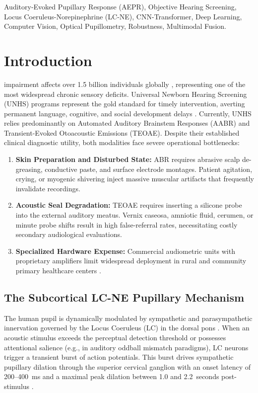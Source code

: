\documentclass[journal]{IEEEtran}
\begin{document}
\begin{IEEEkeywords}
Auditory-Evoked Pupillary Response (AEPR), Objective Hearing Screening, Locus Coeruleus-Norepinephrine (LC-NE), CNN-Transformer, Deep Learning, Computer Vision, Optical Pupillometry, Robustness, Multimodal Fusion.
\end{IEEEkeywords}

\section{Introduction}
 impairment affects over 1.5 billion individuals globally \cite{who2021world}, representing one of the most widespread chronic sensory deficits. Universal Newborn Hearing Screening (UNHS) programs represent the gold standard for timely intervention, averting permanent language, cognitive, and social development delays \cite{yoshinaga2003early}. Currently, UNHS relies predominantly on Automated Auditory Brainstem Responses (AABR) and Transient-Evoked Otoacoustic Emissions (TEOAE). Despite their established clinical diagnostic utility, both modalities face severe operational bottlenecks:
\begin{enumerate}
    \item \textbf{Skin Preparation and Disturbed State:} ABR requires abrasive scalp de-greasing, conductive paste, and surface electrode montages. Patient agitation, crying, or myogenic shivering inject massive muscular artifacts that frequently invalidate recordings.
    \item \textbf{Acoustic Seal Degradation:} TEOAE requires inserting a silicone probe into the external auditory meatus. Vernix caseosa, amniotic fluid, cerumen, or minute probe shifts result in high false-referral rates, necessitating costly secondary audiological evaluations.
    \item \textbf{Specialized Hardware Expense:} Commercial audiometric units with proprietary amplifiers limit widespread deployment in rural and community primary healthcare centers \cite{simons2019newborn}.
\end{enumerate}

\subsection{The Subcortical LC-NE Pupillary Mechanism}
The human pupil is dynamically modulated by sympathetic and parasympathetic innervation governed by the Locus Coeruleus (LC) in the dorsal pons \cite{aston2005integrative, murphy2014pupillometry}. When an acoustic stimulus exceeds the perceptual detection threshold or possesses attentional salience (e.g., in auditory oddball mismatch paradigms), LC neurons trigger a transient burst of action potentials. This burst drives sympathetic pupillary dilation through the superior cervical ganglion with an onset latency of 200--400~ms and a maximal peak dilation between 1.0 and 2.2~seconds post-stimulus \cite{winn2018pupillometry}.
\end{document}
